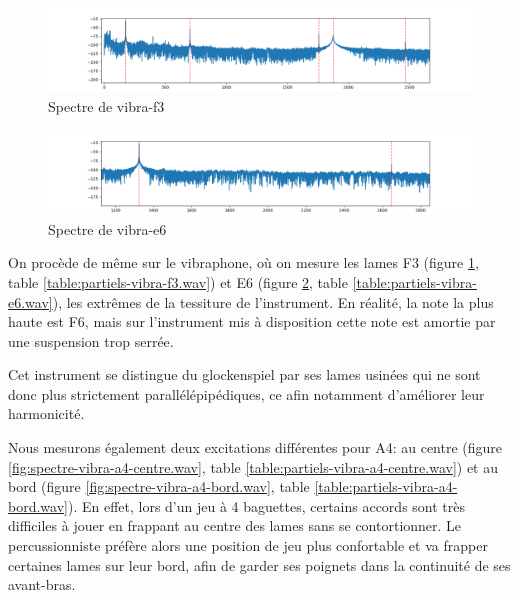 \documentclass[atiam, article]{rapport} %
\begin{document}
\begin{figure}
  \begin{center}
      \includegraphics[width=\textwidth]{percu/vibra-f3.wav.spectre.png}
  \end{center}
  \caption{Spectre de vibra-f3}
  \label{fig:spectre-vibra-f3.wav}
\end{figure}


\begin{figure}
  \begin{center}
      \includegraphics[width=\textwidth]{percu/vibra-e6.wav.spectre.png}
  \end{center}
  \caption{Spectre de vibra-e6}
  \label{fig:spectre-vibra-e6.wav}
\end{figure}


On procède de même sur le vibraphone, où on mesure les lames F3 (figure \ref{fig:spectre-vibra-f3.wav}, table \ref{table:partiels-vibra-f3.wav}) et E6 (figure \ref{fig:spectre-vibra-e6.wav}, table \ref{table:partiels-vibra-e6.wav}), les extrêmes de la tessiture de l'instrument. En réalité, la note la plus haute est F6, mais sur l'instrument mis à disposition cette note est amortie par une suspension trop serrée.

Cet instrument se distingue du glockenspiel par ses lames usinées qui ne sont donc plus strictement parallélépipédiques, ce afin notamment d'améliorer leur harmonicité.

Nous mesurons également deux excitations différentes pour A4: au centre (figure \ref{fig:spectre-vibra-a4-centre.wav}, table \ref{table:partiels-vibra-a4-centre.wav}) et au bord (figure \ref{fig:spectre-vibra-a4-bord.wav}, table \ref{table:partiels-vibra-a4-bord.wav}). En effet, lors d'un jeu à 4 baguettes, certains accords sont très difficiles à jouer en frappant au centre des lames sans se contortionner. Le percussionniste préfère alors une position de jeu plus confortable et va frapper certaines lames sur leur bord, afin de garder ses poignets dans la continuité de ses avant-bras.
\end{document}
